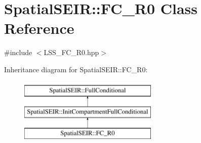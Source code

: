 \hypertarget{classSpatialSEIR_1_1FC__R0}{\section{Spatial\-S\-E\-I\-R\-:\-:F\-C\-\_\-\-R0 Class Reference}
\label{classSpatialSEIR_1_1FC__R0}
}


{\ttfamily \#include $<$L\-S\-S\-\_\-\-F\-C\-\_\-\-R0.\-hpp$>$}

Inheritance diagram for Spatial\-S\-E\-I\-R\-:\-:F\-C\-\_\-\-R0\-:\begin{figure}[H]
\begin{center}
\leavevmode
\includegraphics[height=3.000000cm]{classSpatialSEIR_1_1FC__R0}
\end{center}
\end{figure}
